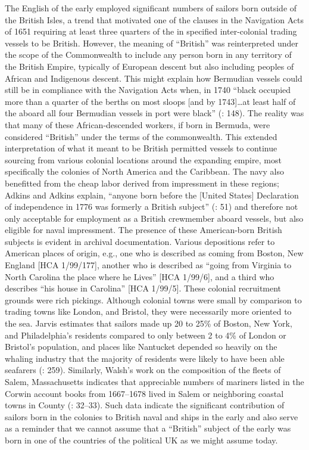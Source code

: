 The English  of the early  employed significant numbers of sailors born outside of the British Isles, a trend that motivated one of the clauses in the Navigation Acts of 1651 requiring at least three quarters of the  in specified inter-colonial trading vessels to be British. However, the meaning of “British” was reinterpreted under the scope of the Commonwealth to include any person born in any territory of the British Empire, typically of European descent but also including peoples of African and Indigenous descent. This might explain how Bermudian vessels could still be in compliance with the Navigation Acts when, in 1740 “black  occupied more than a quarter of the berths on most sloops [and by 1743]…at least half of the  aboard all four Bermudian vessels in port were black” (\citealt{Jarvis2010}: 148). The reality was that many of these African-descended workers, if born in Bermuda, were considered “British” under the terms of the commonwealth. This extended interpretation of what it meant to be British permitted  vessels to continue sourcing  from various colonial locations around the expanding empire, most specifically the colonies of North America and the Caribbean. The navy also benefitted from the cheap labor derived from impressment in these regions; Adkins and Adkins explain, “anyone born before the [United States] Declaration of independence in 1776 was formerly a British subject” (\citeyear*{AdkinsAdkins2008}: 51) and therefore not only acceptable for employment as a British crewmember aboard  vessels, but also eligible for naval impressment. The presence of these American-born British subjects is evident in archival documentation. Various depositions refer to American places of origin, e.g., one  who is described as coming from Boston, New England [HCA 1/99/177], another who is described as “going from Virginia to North Carolina the place where he Lives” [HCA 1/99/6], and a third who describes “his house in Carolina” [HCA 1/99/5]. These colonial recruitment grounds were rich pickings. Although colonial towns were small by comparison to trading towns like London,  and Bristol, they were necessarily more oriented to the sea. Jarvis estimates that sailors made up 20 to 25\% of Boston, New York, and Philadelphia’s residents compared to only between 2 to 4\% of London or Bristol’s population, and places like Nantucket depended so heavily on the whaling industry that the majority of residents were likely to have been able seafarers (\citealt{Jarvis2010}: 259). Similarly, Walsh’s work on the composition of the  fleets of Salem, Massachusetts indicates that appreciable numbers of mariners listed in the Corwin account books from 1667–1678 lived in Salem or neighboring coastal towns in  County (\citealt{Walsh1994}: 32–33). Such data indicate the significant contribution of sailors born in the colonies to British naval and  ships in the early  and also serve as a reminder that we cannot assume that a “British” subject of the early  was born in one of the countries of the political UK as we might assume today. 

